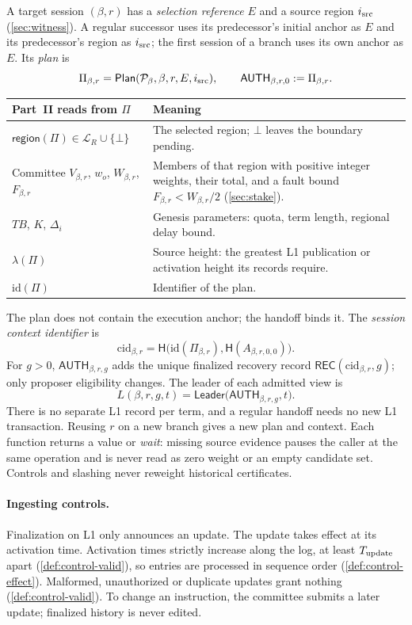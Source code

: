 \documentclass[11pt,a4paper]{article}
\newcommand{\Hash}{\mathsf H}
\newcommand{\TB}{\mathit{TB}}
\newcommand{\tagg}[1]{\ensuremath{\mathsf{#1}}}
\newcommand{\defterm}[1]{\textcolor{rrBlue}{\textit{#1}}}
\begin{document}
A target session $(\beta,r)$ has a \defterm{selection reference} $E$ and
a source region $i_{\rm src}$ (\cref{sec:witness}). A regular successor
uses its predecessor's initial anchor as $E$ and its predecessor's region
as $i_{\rm src}$; the first session of a branch uses its own anchor as
$E$. Its \defterm{plan} is
\[
 \Pi_{\beta,r}=\tagg{Plan}(\mathcal P_\beta,\beta,r,E,i_{\rm src}),
 \qquad \tagg{AUTH}_{\beta,r,0}:=\Pi_{\beta,r}.
\]
\begin{center}\small
\begin{tabularx}{\linewidth}{@{}>{\raggedright\arraybackslash}p{.34\linewidth}Y@{}}\toprule
Part~II reads from $\Pi$ & Meaning\\\midrule
$\tagg{region}(\Pi)\in\mathcal L_R\cup\{\bot\}$ & The selected region;
$\bot$ leaves the boundary pending.\\
Committee $V_{\beta,r}$, $w_o$, $W_{\beta,r}$, $F_{\beta,r}$ & Members of
that region with positive integer weights, their total, and a fault bound
$F_{\beta,r}<W_{\beta,r}/2$ (\cref{sec:stake}).\\
$\TB$, $K$, $\Delta_i$ & Genesis parameters: quota, term length, regional
delay bound.\\
$\lambda(\Pi)$ & Source height: the greatest L1 publication or activation
height its records require.\\
$\mathrm{id}(\Pi)$ & Identifier of the plan.\\\bottomrule
\end{tabularx}
\end{center}
The plan does not contain the execution anchor; the handoff binds it. The
\defterm{session context identifier} is
\[
 \mathrm{cid}_{\beta,r}=\Hash\bigl(\mathrm{id}(\Pi_{\beta,r}),
 \Hash(A_{\beta,r,0,0})\bigr).
\]
For $g>0$, $\tagg{AUTH}_{\beta,r,g}$ adds the unique finalized recovery
record $\tagg{REC}(\mathrm{cid}_{\beta,r},g)$; only proposer eligibility
changes. The leader of each admitted view is
\[
 L(\beta,r,g,t)=\tagg{Leader}\bigl(\tagg{AUTH}_{\beta,r,g},t\bigr).
\]
There is no separate L1 record per term, and a regular handoff needs no
new L1 transaction. Reusing $r$ on a new branch gives a new plan and
context. Each function returns a value or \emph{wait}: missing source
evidence pauses the caller at the same operation and is never read as
zero weight or an empty candidate set. Controls and slashing never
reweight historical certificates.

\paragraph{Ingesting controls.}
Finalization on L1 only announces an update. The update takes effect at
its activation time. Activation times strictly increase along the log,
at least $T_{\rm update}$ apart (\cref{def:control-valid}), so entries
are processed in sequence order (\cref{def:control-effect}). Malformed,
unauthorized or duplicate updates grant nothing
(\cref{def:control-valid}). To change an instruction, the committee
submits a later update; finalized history is never edited.
\end{document}

